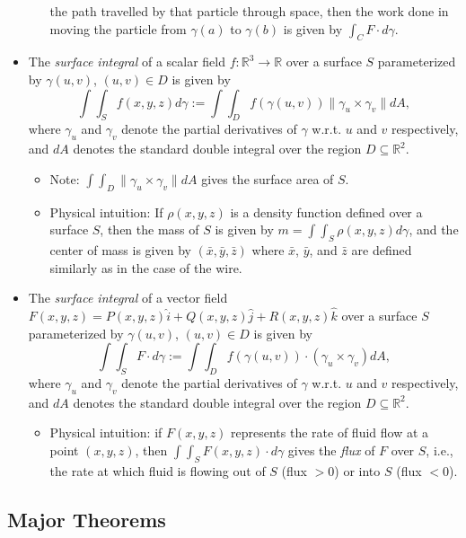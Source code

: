 \documentclass[12pt]{article}
\begin{document}
\begin{itemize}
\begin{itemize}
the path travelled by that particle through space, then the work done in
moving the particle from $\gamma(a)$ to $\gamma(b)$ is given by 
$\int_C F\cdot d\gamma$.
\end{itemize}
\item The {\it surface integral} of a scalar field 
$f : \mathbb{R}^3 \rightarrow \mathbb{R}$ over a surface $S$ parameterized
by $\gamma(u,v)$, $(u,v) \in D$ is given by
$$
\int \int_S f(x,y,z) d\gamma 
:= \int \int_D f\left(\gamma(u,v)\right)\|\gamma_u \times \gamma_v\| dA,
$$
where $\gamma_u$ and $\gamma_v$ denote the partial derivatives of $\gamma$
w.r.t. $u$ and $v$ respectively, and $dA$ denotes the standard double integral
over the region $D \subseteq \mathbb{R}^2$.
\begin{itemize}
\item Note: $\int \int_D \|\gamma_u \times \gamma_v\| dA$ gives the surface
area of $S$.
\item Physical intuition: If $\rho(x,y,z)$ is a density function defined over
a surface $S$, then the mass of $S$ is given by 
$m = \int\int_S \rho(x,y,z) d\gamma$, and the center of mass is given by
$(\bar{x},\bar{y},\bar{z})$ where $\bar{x}$, $\bar{y}$, and $\bar{z}$ are
defined similarly as in the case of the wire.
\end{itemize}
\item The {\it surface integral} of a vector field 
$F(x,y,z) = P(x,y,z)\hat{i} + Q(x,y,z)\hat{j} + R(x,y,z)\hat{k}$ over a
surface $S$ parameterized by $\gamma(u,v)$, $(u,v) \in D$ is given by
$$
\int \int_S F \cdot d\gamma 
:= \int \int_D f\left(\gamma(u,v)\right) 
\cdot \left(\gamma_u \times \gamma_v\right) dA,
$$
where $\gamma_u$ and $\gamma_v$ denote the partial derivatives of $\gamma$
w.r.t. $u$ and $v$ respectively, and $dA$ denotes the standard double integral
over the region $D \subseteq \mathbb{R}^2$.
\begin{itemize}
\item Physical intuition: if $F(x,y,z)$ represents the rate of fluid flow
at a point $(x,y,z)$, then $\int\int_S F(x,y,z) \cdot d\gamma$ gives the
{\it flux} of $F$ over $S$, i.e., the rate at which fluid is flowing out
of $S$ (flux $>0$) or into $S$ (flux $<0$).
\end{itemize}
\end{itemize}

\subsection*{Major Theorems}
\end{document}
